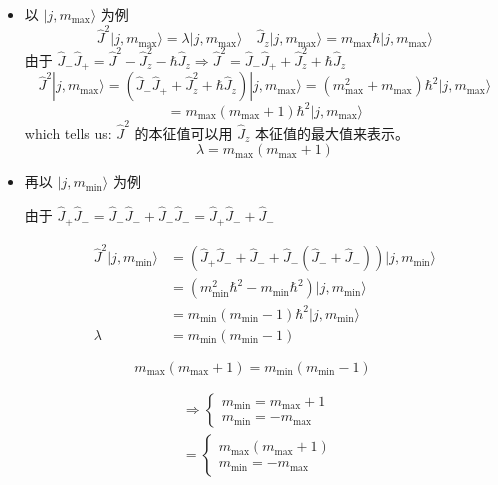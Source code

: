 \documentclass[lang=cn,10pt]{elegantbook}
\begin{document}
\begin{itemize}
	\item 以 \(|j, m_{\text{max}}\rangle\) 为例
	\[
	\hat{J}^2 |j, m_{\text{max}}\rangle = \lambda |j, m_{\text{max}}\rangle \quad \hat{J}_z |j, m_{\text{max}}\rangle = m_{\text{max}} \hbar |j, m_{\text{max}}\rangle
	\]
	由于 \(\hat{J}_- \hat{J}_+ = \hat{J}^2 - \hat{J}_z^2 - \hbar \hat{J}_z \Rightarrow \hat{J}^2 = \hat{J}_- \hat{J}_+ + \hat{J}_z^2 + \hbar \hat{J}_z\)
	\[
	\hat{J}^2 |j, m_{\text{max}}\rangle = (\hat{J}_- \hat{J}_+ + \hat{J}_z^2 + \hbar \hat{J}_z) |j, m_{\text{max}}\rangle = (m_{\text{max}}^2 + m_{\text{max}}) \hbar^2 |j, m_{\text{max}}\rangle
	\]
	\[
	= m_{\text{max}} (m_{\text{max}} + 1) \hbar^2 |j, m_{\text{max}}\rangle
	\]
	which tells us: \(\hat{J}^2\) 的本征值可以用 \(\hat{J}_z\) 本征值的最大值来表示。
	\[
	\lambda = m_{\text{max}} (m_{\text{max}} + 1)
	\]
	
	\item 再以 \(|j, m_{\text{min}}\rangle\) 为例
	
	由于 \(\hat{J}_+ \hat{J}_- = \hat{J}_- \hat{J}_- + \hat{J}_- \hat{J}_- = \hat{J}_+ \hat{J}_- + \hat{J}_-\)
	
	\begin{align*}
		\hat{J}^2 |j, m_{\text{min}}\rangle &= (\hat{J}_+ \hat{J}_- + \hat{J}_- + \hat{J}_- (\hat{J}_- + \hat{J}_-)) |j, m_{\text{min}}\rangle \\
		&= (m_{\text{min}}^2 \hbar^2 - m_{\text{min}} \hbar^2) |j, m_{\text{min}}\rangle \\
		&= m_{\text{min}} (m_{\text{min}} - 1) \hbar^2 |j, m_{\text{min}}\rangle \\
		\lambda &= m_{\text{min}} (m_{\text{min}} - 1)
	\end{align*}
\end{itemize}
\[
m_{\text{max}}(m_{\text{max}} + 1) = m_{\text{min}}(m_{\text{min}} - 1)
\]

\begin{align*}
	&\Longrightarrow \left\{
	\begin{array}{l}
		m_{\text{min}} = m_{\text{max}} + 1 \\
		m_{\text{min}} = -m_{\text{max}}
	\end{array}
	\right. \\
	&= \left\{
	\begin{array}{l}
		m_{\text{max}}(m_{\text{max}} + 1) \\
		m_{\text{min}} = -m_{\text{max}}
	\end{array}
	\right.
\end{align*}
\end{document}
